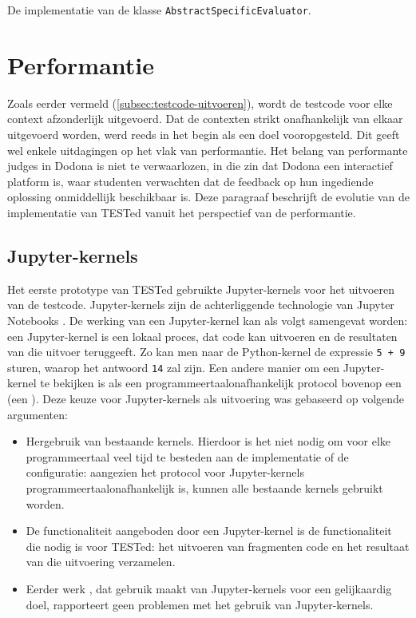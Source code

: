 \begin{listing}
    \inputminted{java}{../../judge/src/tested/languages/templates/java/AbstractSpecificEvaluator.java}
    \caption{De implementatie van de klasse \texttt{AbstractSpecificEvaluator}.}
    \label{lst:evaluation-java-specific}
\end{listing}

\section{Performantie}\label{sec:performantie}

Zoals eerder vermeld (\cref{subsec:testcode-uitvoeren}), wordt de testcode voor elke context afzonderlijk uitgevoerd.
Dat de contexten strikt onafhankelijk van elkaar uitgevoerd worden, werd reeds in het begin als een doel vooropgesteld.
Dit geeft wel enkele uitdagingen op het vlak van performantie.
Het belang van performante judges in Dodona is niet te verwaarlozen, in die zin dat Dodona een interactief platform is, waar studenten verwachten dat de feedback op hun ingediende oplossing onmiddellijk beschikbaar is.
Deze paragraaf beschrijft de evolutie van de implementatie van TESTed vanuit het perspectief van de performantie.

\subsection{Jupyter-kernels}\label{subsec:jupyter-kernels}

Het eerste prototype van TESTed gebruikte Jupyter-kernels voor het uitvoeren van de testcode.
Jupyter-kernels zijn de achterliggende technologie van Jupyter Notebooks \autocite{jupyter2016}.
De werking van een Jupyter-kernel kan als volgt samengevat worden: een Jupyter-kernel is een lokaal proces, dat code kan uitvoeren en de resultaten van die uitvoer teruggeeft.
Zo kan men naar de Python-kernel de expressie \texttt{5 + 9} sturen, waarop het antwoord \texttt{14} zal zijn.
Een andere manier om een Jupyter-kernel te bekijken is als een programmeertaalonafhankelijk protocol bovenop een  (een ).
Deze keuze voor Jupyter-kernels als uitvoering was gebaseerd op volgende argumenten:
\begin{itemize}
    \item Hergebruik van bestaande kernels.
    Hierdoor is het niet nodig om voor elke programmeertaal veel tijd te besteden aan de implementatie of de configuratie: aangezien het protocol voor Jupyter-kernels programmeertaalonafhankelijk is, kunnen alle bestaande kernels gebruikt worden.
    \item De functionaliteit aangeboden door een Jupyter-kernel is de functionaliteit die nodig is voor TESTed: het uitvoeren van fragmenten code en het resultaat van die uitvoering verzamelen.
    \item Eerder werk \autocite{petegem2018}, dat gebruik maakt van Jupyter-kernels voor een gelijkaardig doel, rapporteert geen problemen met het gebruik van Jupyter-kernels.
\end{itemize}

